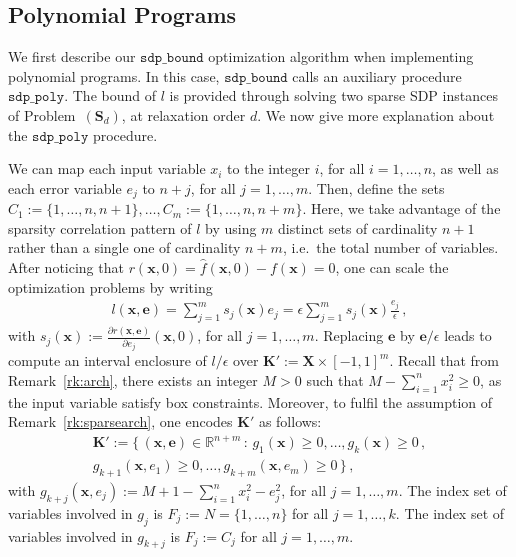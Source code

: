 \documentclass[preprint,fleqn,nocopyrightspace]{sigplanconf}
\newcommand{\R}{\mathbb{R}}
\newcommand{\x}{\mathbf{x}}
\newcommand{\e}{\mathbf{e}}
\def\S{\mathbf{S}}
\def\K{\mathbf{K}}
\def\S{\mathbf{S}}
\def\X{\mathbf{X}}
\newcommand{\sdpbound}{\mathtt{sdp\_bound}}
\newcommand{\sdppoly}{\mathtt{sdp\_poly}}
\theoremstyle{plain}
\begin{document}
\subsection{Polynomial Programs}
\label{sec:polsdp}
%
We first describe our $\sdpbound$ optimization algorithm when implementing polynomial programs. In this case, $\sdpbound$ calls an auxiliary procedure $\sdppoly$.
The bound of $l$ is provided through solving two sparse SDP instances of Problem~$(\S_d)$, at relaxation order $d$. We now give more explanation about the $\sdppoly$ procedure.

We can map each input variable $x_i$ to the integer $i$, for all $i=1,\dots,n$, as well as each error variable $e_j$ to $n+j$, for all $j=1,\dots,m$. Then, define the sets $C_1 := \{1,\dots,n,n+1\}, \dots, C_m := \{1,\dots,n,n+m\}$. Here, we take advantage of the sparsity correlation pattern of $l$ by using $m$ distinct sets of cardinality $n+1$ rather than a single one of cardinality $n+m$, i.e.~the total number of variables. 
After noticing that $r(\x,0) = \hat{f}(\x,0) - f(\x) = 0$, one can scale the optimization problems by writing 
\begin{align}
\label{eq:lscale}
l(\x,\e) = \sum_{j=1}^m s_j (\x) e_j = \epsilon \sum_{j=1}^m s_j (\x) \frac{e_j}{\epsilon} \,,
\end{align}
%
with $s_j(\x) := \frac{\partial r(\x,\e)} {\partial e_j} (\x,0)$, for all $j=1,\dots,m$. Replacing $\e$ by $\e/\epsilon$ leads to compute an interval enclosure of $l/\epsilon$ over $\K' := \X \times [-1, 1]^m$.
Recall that from Remark~\ref{rk:arch}, there exists an integer $M > 0$ such that $M - \sum_{i=1}^n x_i^2 \geq 0$, as the input variable satisfy box constraints.
Moreover, to fulfil the assumption of Remark~\ref{rk:sparsearch},  one encodes $\K'$ as follows: 
\begin{align*}
\K' := \{\, (\x,\e) \in \R^{n+m} \, : \, g_1 (\x) \geq 0, \dots, g_k(\x) \geq 0 \,, \\
g_{k+1}(\x,e_1) \geq 0, \dots, g_{k+m} (\x, e_m) \geq 0 \,\} \,,
\end{align*}
%
with $g_{k+j}(\x, e_j) := M + 1 -  \sum_{i=1}^n x_i^2 - e_j^2$, for all $j=1,\dots, m$. 
The index set of variables involved in $g_j$ is $F_j := N = \{1, \dots, n\}$ for all $j=1, \dots, k$. 
The index set of variables involved in $g_{k+j}$ is $F_j := C_j$ for all $j=1, \dots, m$. 
\end{document}
